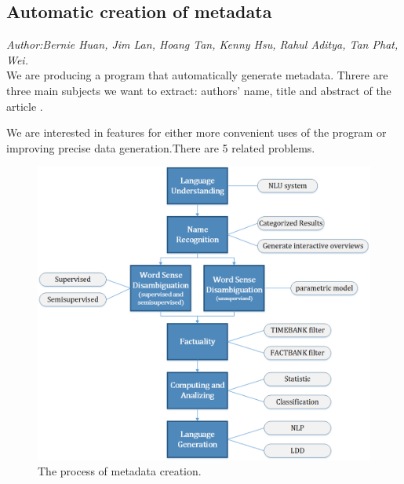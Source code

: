 
\subsection{Automatic creation of metadata}
\textit{\footnotesize Author:Bernie Huan, Jim Lan, Hoang Tan, Kenny Hsu, Rahul Aditya, Tan Phat, Wei.}\\

We are producing a program that automatically generate metadata. Threre are three main subjects we want to extract: authors' name, title and abstract of the article .

We are interested in features for either more convenient uses of the program or improving precise data generation.There are 5 related problems.

\begin{figure}[ht]
	\begin{center}
		\includegraphics[width=1.8\columnwidth]{Union_Background_Chart_1}
	\end{center}
\caption{The process of metadata creation.}
\end{figure}

